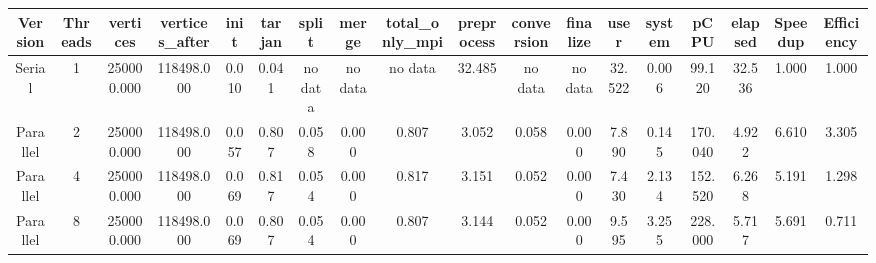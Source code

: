 \begin{tabular}{|c|c|c|c|c|c|c|c|c|c|c|c|c|c|c|c|c|c|}
\toprule
 Version &  Threads &   vertices &  vertices\_after &  init &  tarjan &   split &   merge & total\_only\_mpi &  preprocess & conversion & finalize &   user &  system &    pCPU &  elapsed &  Speedup &  Efficiency \\
\midrule
  Serial &        1 & 250000.000 &      118498.000 & 0.010 &   0.041 & no data & no data &        no data &      32.485 &    no data &  no data & 32.522 &   0.006 &  99.120 &   32.536 &    1.000 &       1.000 \\
Parallel &        2 & 250000.000 &      118498.000 & 0.057 &   0.807 &   0.058 &   0.000 &          0.807 &       3.052 &      0.058 &    0.000 &  7.890 &   0.145 & 170.040 &    4.922 &    6.610 &       3.305 \\
Parallel &        4 & 250000.000 &      118498.000 & 0.069 &   0.817 &   0.054 &   0.000 &          0.817 &       3.151 &      0.052 &    0.000 &  7.430 &   2.134 & 152.520 &    6.268 &    5.191 &       1.298 \\
Parallel &        8 & 250000.000 &      118498.000 & 0.069 &   0.807 &   0.054 &   0.000 &          0.807 &       3.144 &      0.052 &    0.000 &  9.595 &   3.255 & 228.000 &    5.717 &    5.691 &       0.711 \\
\bottomrule
\end{tabular}
